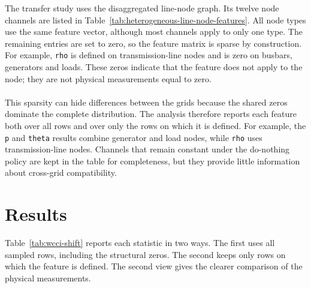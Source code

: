 The transfer study uses the disaggregated line-node graph. Its
twelve node channels are listed in
Table~\ref{tab:heterogeneous-line-node-features}. All node types use the same
feature vector, although most channels apply to only one type. The remaining
entries are set to zero, so the feature matrix is sparse by construction. For
example, \texttt{rho} is defined on transmission-line nodes and is zero on
busbars, generators and loads. These zeros indicate that the feature does not
apply to the node; they are not physical measurements equal to zero.
\\
\\
This sparsity can hide differences between the grids because
the shared zeros dominate the complete distribution. The analysis therefore
reports each feature both over all rows and over only the rows on which it is
defined. For example, the \texttt{p} and \texttt{theta} results combine
generator and load nodes, while \texttt{rho} uses transmission-line nodes.
Channels that remain constant under the do-nothing policy are kept in the table
for completeness, but they provide little information about cross-grid
compatibility.


\section{Results}
\label{sec:wcci-results}

Table~\ref{tab:wcci-shift} reports each statistic in two ways.
The first uses all sampled rows, including the structural zeros. The second
keeps only rows on which the feature is defined. The second view gives the
clearer comparison of the physical measurements.

